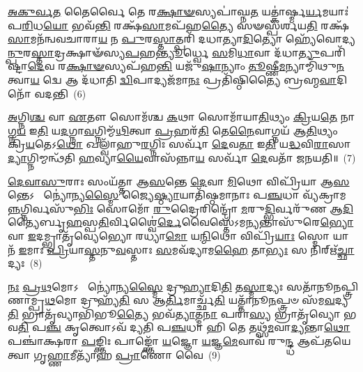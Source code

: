 \-\ul{𑌅}\-\-\ul{𑌕𑍁}\-\-\ul{𑌰𑍍𑌵}\-\-\ul{𑌤} 𑌤𑍈𑌰𑍍𑌵𑍈 𑌤𑍇 𑌰\-\ul{𑌕𑍍𑌷𑌾}\-\-\ul{𑍟}\-𑌸𑍍𑌯𑌪𑌾॑𑌘𑍍𑌨\-\ul{𑌤} 𑌯𑌤𑍍𑌕𑌾॑𑌰𑍍𑌷𑍍𑌮\-\ul{𑌰𑍍𑌯}\-𑌮𑌯𑌾𑌃॑ 𑌪\-\ul{𑌰𑌿}\-𑌧\-\ul{𑌯𑍋} 𑌭𑌵᳴\-\ul{𑌨𑍍𑌤𑌿} 𑌰𑌕𑍍𑌷᳴\-\ul{𑌸𑌾}\-𑌮𑌪᳴𑌹\-\ul{𑌤𑍍𑌯𑍈} 𑌸𑍟𑌸𑍍𑌪᳴𑌰𑍍𑌶𑌯\-\ul{𑌤𑌿} 𑌰𑌕𑍍𑌷᳴\-\ul{𑌸𑌾}\-𑌮𑌨᳴𑌨𑍍𑌵𑌵𑌚𑌾𑌰𑌾\-\ul{𑌯} 𑌨 \ul{𑌪𑍁}\-𑌰\-\ul{𑌸𑍍𑌤𑌾}\-𑌤𑍍𑌪𑌰𑌿᳴ 𑌦𑌧𑌾𑌤𑍍𑌯𑌾\-\ul{𑌦𑌿}\-𑌤𑍍𑌯𑍋 𑌹𑍍𑌯𑍇᳴𑌵𑍋𑌦𑍍𑌯\-\ul{𑌨𑍍𑌪𑍁}\-𑌰\-\ul{𑌸𑍍𑌤𑌾}\-𑌦𑍍𑌰𑌕𑍍𑌷𑌾𑍟᳴𑌸𑍍𑌯\-\ul{𑌪}\-𑌹\-\ul{𑌨𑍍𑌤𑍍𑌯𑍂}\-𑌰𑍍𑌧𑍍𑌵𑍇 \ul{𑌸}\-𑌮𑌿\-\ul{𑌧𑌾}\-𑌵𑌾 𑌦᳴𑌧𑌾\-\ul{𑌤𑍍𑌯𑍁}\-𑌪𑌰𑌿᳴𑌷𑍍𑌟𑌾\-\ul{𑌦𑍇}\-𑌵 𑌰\-\ul{𑌕𑍍𑌷𑌾}\-\-\ul{𑍟}\-𑌸𑍍𑌯𑌪᳴𑌹\-\ul{𑌨𑍍𑌤𑌿} 𑌯𑌜𑍁᳴\-\ul{𑌷𑌾}\-𑌨𑍍𑌯𑌾𑌂 \ul{𑌤𑍂}\-𑌷𑍍𑌣𑍀\-\ul{𑌮}\-𑌨𑍍𑌯𑌾𑌮𑍍𑌮𑌿᳴𑌥𑍁\-\ul{𑌨}\-𑌤𑍍𑌵𑌾\-\ul{𑌯} 𑌦𑍍𑌵𑍇 𑌆 𑌦᳴𑌧𑌾𑌤𑌿 \ul{𑌦𑍍𑌵𑌿}\-𑌪𑌾𑌦𑍍𑌯𑌜᳴𑌮𑌾\-\ul{𑌨𑌃} 𑌪𑍍𑌰𑌤𑌿᳴𑌷𑍍𑌠𑌿𑌤𑍍𑌯𑍈 𑌬𑍍𑌰𑌹𑍍𑌮\-\ul{𑌵𑌾}\-𑌦𑌿𑌨𑍋᳴ 𑌵𑌦𑌨𑍍𑌤𑌿~(6)

\-\ul{𑌅}\-𑌗𑍍𑌨𑌿\-\ul{𑌶𑍍𑌚} 𑌵𑌾 \ul{𑌏}\-𑌤𑍗 𑌸𑍋𑌮᳴𑌶𑍍𑌚 \ul{𑌕}\-𑌥𑌾 𑌸𑍋𑌮𑌾᳴𑌯𑌾\-\ul{𑌤𑌿}\-𑌥𑍍𑌯𑌂 \ul{𑌕𑍍𑌰𑌿}\-𑌯\-\ul{𑌤𑍇} 𑌨𑌾𑌗𑍍𑌨\-\ul{𑌯} 𑌇\-\ul{𑌤𑌿} 𑌯\-\ul{𑌦}\-𑌗𑍍𑌨𑌾\-\ul{𑌵}\-𑌗𑍍𑌨𑌿𑌮𑍍𑌮᳴\-\ul{𑌥𑌿}\-𑌤𑍍𑌵𑌾 \ul{𑌪𑍍𑌰}\-𑌹𑌰᳴\-\ul{𑌤𑌿} 𑌤𑍇\-\ul{𑌨𑍈}\-𑌵𑌾𑌗𑍍𑌨𑌯᳴ 𑌆\-\ul{𑌤𑌿}\-𑌥𑍍𑌯𑌂 𑌕𑍍𑌰𑌿᳴\-\ul{𑌯}\-𑌤𑍇\-𑌽\-\ul{𑌥𑍋} 𑌖𑌲𑍍𑌵𑌾᳴𑌹𑍁\-\ul{𑌰}\-𑌗𑍍𑌨𑌿𑌃 𑌸𑌰𑍍𑌵𑌾᳴ \ul{𑌦𑍇}\-𑌵\-\ul{𑌤𑌾} 𑌇\-\ul{𑌤𑌿} 𑌯\-\ul{𑌦𑍍𑌧}\-𑌵𑌿\-\ul{𑌰𑌾}\-𑌸𑌾\-\ul{𑌦𑍍𑌯𑌾}\-𑌗𑍍𑌨𑌿𑌮𑍍𑌮𑌨𑍍𑌥᳴𑌤𑌿 \ul{𑌹}\-𑌵𑍍𑌯𑌾\-\ul{𑌯𑍈}\-𑌵𑌾𑌸᳴𑌨𑍍𑌨𑌾\-\ul{𑌯} 𑌸𑌰𑍍𑌵𑌾᳴ \ul{𑌦𑍇}\-𑌵𑌤𑌾᳴ 𑌜𑌨𑌯𑌤𑌿॥~(7)

{\anuvakamend[{𑌪𑌤𑍍𑌨𑌿᳴𑌯𑌾 \ul{𑌏}\-𑌵 𑌜𑌗᳴\-\ul{𑌤𑍍𑌯𑌾} 𑌆 \ul{𑌤𑍍𑌰𑌿}\-𑌵𑍃𑌦𑍍𑌵𑍈 𑌪᳴\-\ul{𑌰𑌿}\-𑌧𑍀𑌨𑍍 𑌵᳴\-\ul{𑌦}\-𑌨𑍍𑌤𑍍𑌯𑍇𑌕᳴𑌚𑌤𑍍𑌵𑌾𑌰𑌿𑍞𑌶𑌚𑍍𑌚}]}%

\-\ul{𑌦𑍇}\-\-\ul{𑌵𑌾}\-\-\ul{𑌸𑍁}\-𑌰𑌾𑌃 𑌸𑌂𑌯᳴𑌤𑍍𑌤𑌾 𑌆\-\ul{𑌸}\-𑌨𑍍𑌤𑍇 \ul{𑌦𑍇}\-𑌵𑌾 \ul{𑌮𑌿}\-𑌥𑍋 𑌵𑌿𑌪𑍍𑌰𑌿᳴𑌯𑌾 𑌆\-\ul{𑌸}\-𑌨𑍍𑌤𑍇\-𑌽  𑌨𑍍𑌯𑍋॑𑌨𑍍𑌯\-\ul{𑌸𑍍𑌮𑍈} 𑌜𑍍𑌯𑍈\-\ul{𑌷𑍍𑌠𑍍𑌯𑌾}\-𑌯𑌾𑌤𑌿᳴𑌷𑍍𑌠𑌮𑌾𑌨𑌾𑌃 𑌪\-\ul{𑌞𑍍𑌚}\-𑌧𑌾 𑌵𑍍𑌯᳴𑌕𑍍𑌰𑌾𑌮\-\ul{𑌨𑍍𑌨}\-𑌗𑍍𑌨𑌿\-𑌰𑍍𑌵𑌸𑍁᳴\-\ul{𑌭𑌿𑌃} 𑌸𑍋𑌮𑍋᳴ \ul{𑌰𑍁}\-𑌦𑍍𑌰𑍈𑌰𑌿𑌨𑍍𑌦𑍍𑌰𑍋᳴ \ul{𑌮}\-𑌰𑍁\-\ul{𑌦𑍍𑌭𑌿}\-𑌰𑍍𑌵𑌰𑍁᳴𑌣 𑌆\-\ul{𑌦𑌿}\-𑌤𑍍𑌯𑍈𑌰𑍍𑌬𑍃\-\ul{𑌹}\-𑌸𑍍𑌪\-\ul{𑌤𑌿}\-𑌰𑍍𑌵𑌿𑌶𑍍𑌵𑍈॑\-\ul{𑌰𑍍𑌦𑍇}\-𑌵𑍈𑌸𑍍𑌤𑍇᳴\-𑌽𑌮\-\ul{𑌨𑍍𑌯}\-𑌨𑍍𑌤𑌾𑌸𑍁᳴𑌰𑍇\-\ul{𑌭𑍍𑌯𑍋} 𑌵𑌾 \ul{𑌇}\-𑌦𑌮𑍍𑌭𑍍𑌰𑌾𑌤𑍃᳴𑌵𑍍𑌯𑍇𑌭𑍍𑌯𑍋 𑌰𑌧𑍍𑌯𑌾\-\ul{𑌮𑍋} 𑌯\-\ul{𑌨𑍍𑌮𑌿}\-𑌥𑍋 𑌵𑌿𑌪𑍍𑌰𑌿᳴\-\ul{𑌯𑌾𑌃} 𑌸𑍍𑌮𑍋 𑌯𑌾 𑌨᳴ \ul{𑌇}\-𑌮𑌾𑌃 \ul{𑌪𑍍𑌰𑌿}\-𑌯𑌾\-\ul{𑌸𑍍𑌤}\-𑌨𑍁\-\ul{𑌵}\-𑌸𑍍𑌤𑌾𑌃 \ul{𑌸}\-𑌮𑌵᳴𑌦𑍍𑌯𑌾𑌮\-\ul{𑌹𑍈} 𑌤𑌾\-\ul{𑌭𑍍𑌯𑌃} 𑌸 𑌨𑌿𑌰𑍍\mbox{}𑌋᳴\-\ul{𑌚𑍍𑌛𑌾}\-𑌦𑍍𑌯𑌃~(8)

\-\ul{𑌨𑌃} \ul{𑌪𑍍𑌰}\-\-\ul{𑌥}\-𑌮𑍋\-𑌽  𑌨𑍍𑌯𑍋॑𑌨𑍍𑌯\-\ul{𑌸𑍍𑌮𑍈} 𑌦𑍍𑌰𑍁\-\ul{𑌹𑍍𑌯𑌾}\-𑌦𑌿\-\ul{𑌤𑌿} 𑌤\-\ul{𑌸𑍍𑌮𑌾}\-𑌦𑍍𑌯𑌃 𑌸𑌤𑌾᳴𑌨𑍂𑌨𑌪𑍍𑌤𑍍𑌰𑌿𑌣𑌾𑌮𑍍𑌪𑍍𑌰\-\ul{𑌥}\-𑌮𑍋 𑌦𑍍𑌰𑍁𑌹𑍍𑌯᳴\-\ul{𑌤𑌿} 𑌸 𑌆\-\ul{𑌰𑍍𑌤𑌿}\-𑌮𑌾𑌰𑍍𑌚𑍍𑌛᳴\-\ul{𑌤𑌿} 𑌯𑌤𑍍𑌤𑌾᳴𑌨𑍂\-\ul{𑌨}\-𑌪𑍍𑌤𑍍𑌰𑍞 𑌸᳴𑌮\-\ul{𑌵}\-𑌦𑍍𑌯\-\ul{𑌤𑌿} 𑌭𑍍𑌰𑌾𑌤𑍃᳴𑌵𑍍𑌯𑌾𑌭𑌿𑌭𑍂\-\ul{𑌤𑍍𑌯𑍈} 𑌭𑌵᳴\-\ul{𑌤𑍍𑌯𑌾}\-𑌤𑍍𑌮\-\ul{𑌨𑌾} 𑌪𑌰𑌾॑\-\ul{𑌸𑍍𑌯} 𑌭𑍍𑌰𑌾𑌤𑍃᳴𑌵𑍍𑌯𑍋 𑌭𑌵\-\ul{𑌤𑌿} 𑌪\-\ul{𑌞𑍍𑌚} 𑌕𑍃𑌤𑍍𑌵𑍋\-𑌽𑌵᳴ 𑌦𑍍𑌯𑌤𑌿 𑌪\-\ul{𑌞𑍍𑌚}\-𑌧𑌾 𑌹𑌿 𑌤𑍇 𑌤𑌥𑍍𑌸᳴\-\ul{𑌮}\-𑌵𑌾\-\ul{𑌦𑍍𑌯}\-𑌨𑍍𑌤𑌾\-\ul{𑌥𑍋} 𑌪𑌞𑍍𑌚𑌾॑𑌕𑍍𑌷𑌰𑌾 \ul{𑌪}\-𑌙𑍍𑌕𑍍𑌤𑌿𑌃 𑌪𑌾𑌙𑍍𑌕𑍍𑌤𑍋᳴ \ul{𑌯}\-𑌜𑍍𑌞𑍋 \ul{𑌯}\-𑌜𑍍𑌞\-\ul{𑌮𑍇}\-𑌵𑌾𑌵᳴ 𑌰𑍁\-\ul{𑌨𑍍𑌦𑍍𑌧} 𑌆𑌪᳴𑌤𑌯𑍇 𑌤𑍍𑌵𑌾 𑌗𑍃\-\ul{𑌹𑍍𑌣𑌾}\-𑌮𑍀𑌤𑍍𑌯𑌾᳴𑌹 \ul{𑌪𑍍𑌰𑌾}\-𑌣𑍋 𑌵𑍈~(9)

